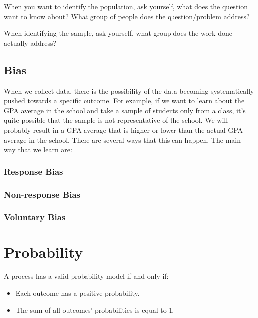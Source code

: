 \documentclass[
]{book}
\providecommand{\tightlist}{%
  \setlength{\itemsep}{0pt}\setlength{\parskip}{0pt}}
\theoremstyle{definition}
\theoremstyle{definition}
\theoremstyle{definition}
\theoremstyle{definition}
\theoremstyle{remark}
\begin{document}
When you want to identify the population, ask yourself, what does the
question want to know about? What group of people does the
question/problem address?

When identifying the sample, ask yourself, what group does the work done
actually address?

\hypertarget{bias}{%
\section{Bias}\label{bias}}

When we collect data, there is the possibility of the data becoming
systematically pushed towards a specific outcome. For example, if we
want to learn about the GPA average in the school and take a sample of
students only from a class, it's quite possible that the sample is not
representative of the school. We will probably result in a GPA average
that is higher or lower than the actual GPA average in the school. There
are several ways that this can happen. The main way that we learn are:

\hypertarget{response-bias}{%
\subsection{Response Bias}\label{response-bias}}

\hypertarget{non-response-bias}{%
\subsection{Non-response Bias}\label{non-response-bias}}

\hypertarget{voluntary-bias}{%
\subsection{Voluntary Bias}\label{voluntary-bias}}

\hypertarget{probability}{%
\chapter{Probability}\label{probability}}

A process has a valid probability model if and only if:

\begin{itemize}
\tightlist
\item
  Each outcome has a positive probability.
\item
  The sum of all outcomes' probabilities is equal to 1.
\end{itemize}
\end{document}
